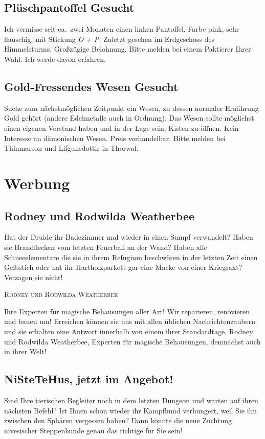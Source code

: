 \documentclass[final]{multiversum}
\begin{document}
\subsection{Plüschpantoffel Gesucht}
Ich vermisse seit ca.\ zwei Monaten einen linken Pantoffel.  Farbe pink, sehr
flauschig, mit Stickung \emph{O + P}.  Zuletzt gesehen im Erdgeschoss des
Himmelsturms.  Großzügige Belohnung.  Bitte melden bei einem Paktierer Ihrer Wahl.
Ich werde davon erfahren.

\subsection{Gold-Fressendes Wesen Gesucht}
Suche zum nächstmöglichen Zeitpunkt ein Wesen, zu dessen normaler Ernährung Gold
gehört (andere Edelmetalle auch in Ordnung). Das Wesen sollte möglichst einen
eigenen Verstand haben und in der Lage sein, Kisten zu öffnen.  Kein Interesse
an dämonischen Wesen.  Preis verhandelbar.  Bitte melden bei Thinmarson und
Lifgunsdottir in Thorwal.


\section{Werbung}
\subsection{Rodney und Rodwilda Weatherbee}
Hat der Druide ihr Badezimmer mal wieder in einen Sumpf verwandelt?  Haben sie
Brandflecken vom letzten Feuerball an der Wand? Haben alle Schneeelementare die
sie in ihrem Refugium beschwören in der letzten Zeit einen Gelbstich oder hat
ihr Hartholzparkett gar eine Macke von einer Kriegsaxt? Verzagen sie nicht!

\begin{center}\textsc{Rodney und Rodwilda Weatherbee}\end{center}

Ihre Experten für magische Behausungen aller Art!
Wir reparieren, renovieren und bauen um!  Erreichen können sie uns mit allen
üblichen Nachrichtenzaubern und sie erhalten eine Antwort innerhalb von einem
ihrer Standardtage.  Rodney und Rodwilda Weatherbee, Experten für magische
Behausungen, demnächst auch in ihrer Welt!

\subsection{NiSteTeHus, jetzt im Angebot!}
Sind Ihre tierischen Begleiter noch in dem letzten Dungeon und warten auf ihren
nächsten Befehl?  Ist Ihnen schon wieder ihr Kampfhund verhungert, weil Sie ihn
zwischen den Sphären vergessen haben?  Dann könnte die neue Züchtung nivesischer
Steppenhunde genau das richtige für Sie sein!  
\end{document}
